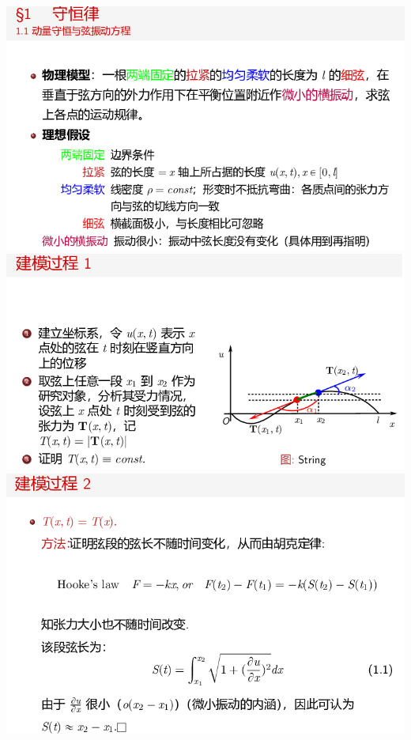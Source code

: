 \documentclass[11pt,a4paper]{ctexart}
\begin{document}
\begin{paracol}{2}
\includegraphics[width=\linewidth]{chap01_09.png}
\includegraphics[width=\linewidth]{chap01_10.png}
\includegraphics[width=\linewidth]{chap01_11.png}
\newpage

\end{paracol}
\end{document}
